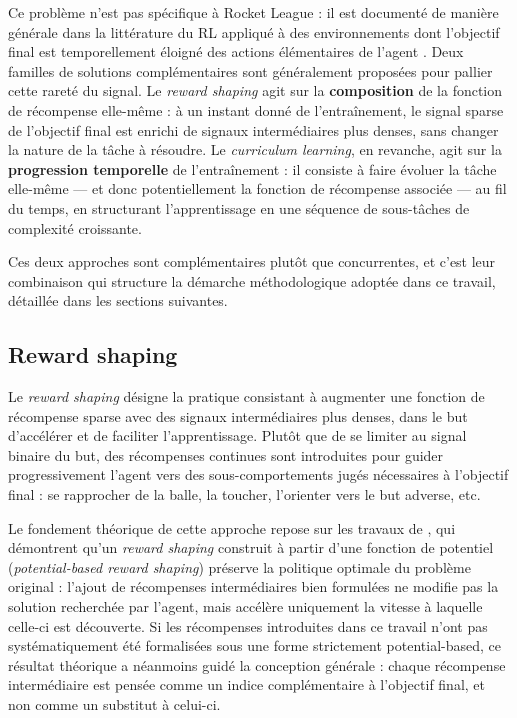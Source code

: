 Ce problème n'est pas spécifique à Rocket League : il est documenté de manière générale dans la littérature du RL appliqué à des environnements dont l'objectif final est temporellement éloigné des actions élémentaires de l'agent \parencite{narvekarCurriculumLearningReinforcement2020}. Deux familles de solutions complémentaires sont généralement proposées pour pallier cette rareté du signal. Le \textit{reward shaping} agit sur la \textbf{composition} de la fonction de récompense elle-même : à un instant donné de l'entraînement, le signal sparse de l'objectif final est enrichi de signaux intermédiaires plus denses, sans changer la nature de la tâche à résoudre. Le \textit{curriculum learning}, en revanche, agit sur la \textbf{progression temporelle} de l'entraînement : il consiste à faire évoluer la tâche elle-même — et donc potentiellement la fonction de récompense associée — au fil du temps, en structurant l'apprentissage en une séquence de sous-tâches de complexité croissante.

Ces deux approches sont complémentaires plutôt que concurrentes, et c'est leur combinaison qui structure la démarche méthodologique adoptée dans ce travail, détaillée dans les sections suivantes.

\subsection{Reward shaping}
\label{sec:reward_shaping}

Le \textit{reward shaping} désigne la pratique consistant à augmenter une fonction de récompense sparse avec des signaux intermédiaires plus denses, dans le but d'accélérer et de faciliter l'apprentissage. Plutôt que de se limiter au signal binaire du but, des récompenses continues sont introduites pour guider progressivement l'agent vers des sous-comportements jugés nécessaires à l'objectif final : se rapprocher de la balle, la toucher, l'orienter vers le but adverse, etc.

Le fondement théorique de cette approche repose sur les travaux de \textcite{645528.657613}, qui démontrent qu'un \textit{reward shaping} construit à partir d'une fonction de potentiel (\textit{potential-based reward shaping}) préserve la politique optimale du problème original : l'ajout de récompenses intermédiaires bien formulées ne modifie pas la solution recherchée par l'agent, mais accélère uniquement la vitesse à laquelle celle-ci est découverte. Si les récompenses introduites dans ce travail n'ont pas systématiquement été formalisées sous une forme strictement potential-based, ce résultat théorique a néanmoins guidé la conception générale : chaque récompense intermédiaire est pensée comme un indice complémentaire à l'objectif final, et non comme un substitut à celui-ci.

